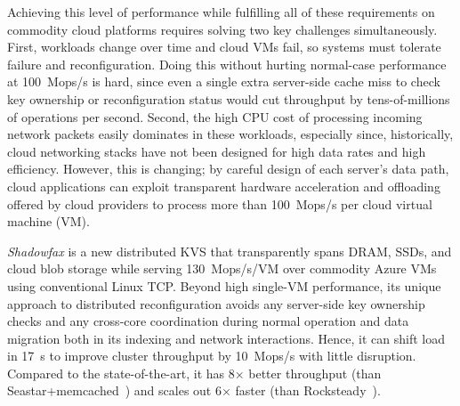 Achieving this level of performance while fulfilling all of these
requirements on commodity cloud platforms requires solving two key challenges
simultaneously.
%
First, workloads change over time and cloud VMs fail, so systems must tolerate
failure and reconfiguration.
%
Doing this without hurting normal-case performance at 100~Mops/s is hard, since
even a single extra server-side cache miss to check key ownership or
reconfiguration status would cut throughput by tens-of-millions of operations
per second.
%
Second, the high CPU cost of processing incoming network
packets easily dominates in these workloads,
especially since, historically, cloud networking stacks have not been designed
for high data rates and high efficiency.
%
However, this is changing; by careful design of each server's data path, cloud
applications can exploit transparent hardware acceleration and offloading
offered by cloud providers to process more than 100~Mops/s per cloud virtual
machine (VM).

\emph{Shadowfax} is a new distributed KVS that transparently
spans DRAM, SSDs, and cloud blob storage while serving 130~Mops/s/VM over
commodity Azure VMs~\cite{azure} using conventional Linux TCP.
%
Beyond high single-VM performance, its unique approach to
distributed reconfiguration avoids any server-side key ownership checks
and any cross-core coordination during
normal operation and data migration both in its indexing and network interactions.
%
Hence,
it can shift load in 17~s to improve cluster throughput by
10~Mops/s
with little disruption.
%
Compared to the state-of-the-art, it has 8$\times{}$ better throughput (than
Seastar+memcached~\cite{seastar}) and scales out 6$\times{}$ faster (than
Rocksteady~\cite{rocksteady}).

